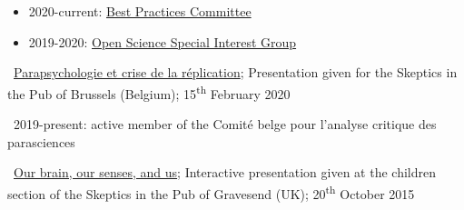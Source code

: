 

\begin{itemize}
    \item 2020-current: \href{https://www.humanbrainmapping.org/i4a/pages/index.cfm?pageid=4027}{Best Practices Committee}
    \item 2019-2020: \href{https://www.humanbrainmapping.org/i4a/pages/index.cfm?pageID=3712}{Open Science Special Interest Group} 
\end{itemize}






\textbullet~\href{https://osf.io/wm3r6/}{Parapsychologie et crise de la réplication};
Presentation given for the Skeptics in the Pub of Brussels (Belgium);
15\textsuperscript{th} February 2020


\textbullet~2019-present: active member of the Comité belge pour l'analyse critique des parasciences

\textbullet~\href{https://osf.io/5a8e9/}{Our brain, our senses, and us};
Interactive presentation given at the children section
of the Skeptics in the Pub of Gravesend (UK); 20\textsuperscript{th} October 2015
